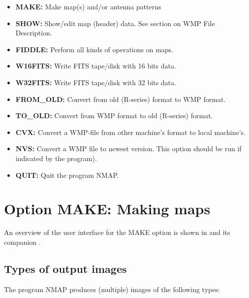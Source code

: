 \begin{itemize}
\item {\bf  MAKE:}      Make map(s) and/or antenna patterns
\item {\bf  SHOW:}      Show/edit map (header) data.
			See section on WMP File Description.
\item {\bf  FIDDLE:}    Perform all kinds of operations on maps.
\item {\bf  W16FITS:}   Write FITS tape/disk with 16 bits data.
\item {\bf  W32FITS:}   Write FITS tape/disk with 32 bits data.
\item {\bf  FROM\_OLD:} Convert from old (R-series) format to WMP format.
\item {\bf  TO\_OLD:}   Convert from WMP format to old (R-series) format.
\item {\bf  CVX:}       Convert a WMP-file from other machine's format
			to local machine's.
\item {\bf  NVS:}       Convert a WMP file to newest version.
			This option should be run if indicated by the program).
\item {\bf  QUIT:}      Quit the program NMAP.
\end{itemize}



\section{Option MAKE: Making maps}
\label{.make}

	An overview of the user interface for the MAKE option is shown in
 and its companion .




\subsection{Types of output images}
\label{.make.output}

	The program NMAP produces (multiple) images of the following types:

